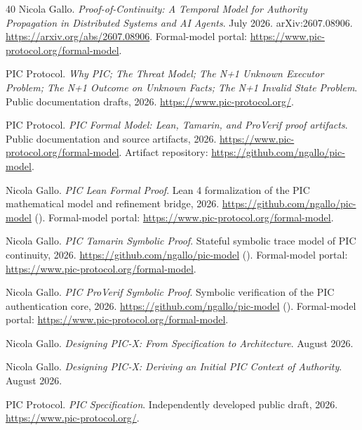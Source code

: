 \documentclass[10pt,oneside,openany]{book}
\begin{document}
\clearpage
\renewcommand{\bibname}{References}
\begin{thebibliography}{40}
Nicola Gallo.
\newblock \emph{Proof-of-Continuity: A Temporal Model for Authority Propagation in Distributed Systems and AI Agents}.
 July 2026. arXiv:2607.08906. \url{https://arxiv.org/abs/2607.08906}. Formal-model portal: \url{https://www.pic-protocol.org/formal-model}.

PIC Protocol.
\newblock \emph{Why PIC; The Threat Model; The N+1 Unknown Executor Problem; The N+1 Outcome on Unknown Facts; The N+1 Invalid State Problem}.
\newblock Public documentation drafts, 2026. \url{https://www.pic-protocol.org/}.

PIC Protocol.
\newblock \emph{PIC Formal Model: Lean, Tamarin, and ProVerif proof artifacts}.
\newblock Public documentation and source artifacts, 2026. \url{https://www.pic-protocol.org/formal-model}. Artifact repository: \url{https://github.com/ngallo/pic-model}.

Nicola Gallo.
\newblock \emph{PIC Lean Formal Proof}.
\newblock Lean 4 formalization of the PIC mathematical model and refinement bridge, 2026. \url{https://github.com/ngallo/pic-model} (). Formal-model portal: \url{https://www.pic-protocol.org/formal-model}.

Nicola Gallo.
\newblock \emph{PIC Tamarin Symbolic Proof}.
\newblock Stateful symbolic trace model of PIC continuity, 2026. \url{https://github.com/ngallo/pic-model} (). Formal-model portal: \url{https://www.pic-protocol.org/formal-model}.

Nicola Gallo.
\newblock \emph{PIC ProVerif Symbolic Proof}.
\newblock Symbolic verification of the PIC authentication core, 2026. \url{https://github.com/ngallo/pic-model} (). Formal-model portal: \url{https://www.pic-protocol.org/formal-model}.

Nicola Gallo.
\newblock \emph{Designing PIC-X: From Specification to Architecture}.
 August 2026.

Nicola Gallo.
\newblock \emph{Designing PIC-X: Deriving an Initial PIC Context of Authority}.
 August 2026.

PIC Protocol.
\newblock \emph{PIC Specification}.
\newblock Independently developed public draft, 2026. \url{https://www.pic-protocol.org/}.


\end{thebibliography}
\end{document}
